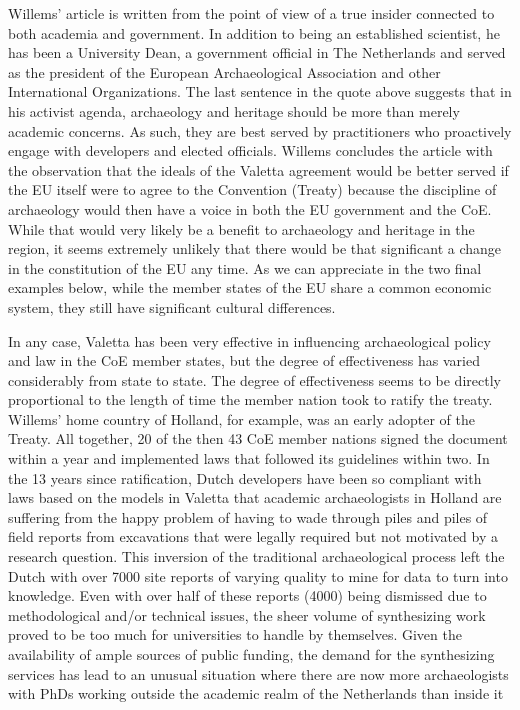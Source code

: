 Willems’ article is written from the point of view of a true insider connected to both academia and government. In addition to being an established scientist, he has been a University Dean, a government official in The Netherlands and served as the president of the European Archaeological Association and other International Organizations. The last sentence in the quote above suggests that in his activist agenda, archaeology and heritage should be more than merely academic concerns. As such, they are best served by practitioners who proactively engage with developers and elected officials. Willems concludes the article with the observation that the ideals of the Valetta agreement would be better served if the EU itself were to agree to the Convention (Treaty) because the discipline of archaeology would then have a voice in both the EU government and the CoE. While that would very likely be a benefit to archaeology and heritage in the region, it seems extremely unlikely that there would be that significant a change in the constitution of the EU any time. As we can appreciate in the two final examples below, while the member states of the EU share a common economic system, they still have significant cultural differences. 

In any case, Valetta has been very effective in influencing archaeological policy and law in the CoE member states, but the degree of effectiveness has varied considerably from state to state. The degree of effectiveness seems to be directly proportional to the length of time the member nation took to ratify the treaty. Willems’ home country of Holland, for example, was an early adopter of the Treaty. All together, \num{20} of the then \num{43} CoE member nations signed the document within a year and implemented laws that followed its guidelines within two. 
In the \num{13} years since ratification, Dutch developers have been so compliant with laws based on the models in Valetta that academic archaeologists in Holland are suffering from the happy problem of having to wade through piles and piles of field reports from excavations that were legally required but not motivated by a research question. This inversion of the traditional archaeological process left the Dutch with over \num{7000} site reports of varying quality to mine for data to turn into knowledge. 
Even with over half of these reports (\num{4000}) being dismissed due to methodological and/or technical issues, the sheer volume of synthesizing work proved to be too much for universities to handle by themselves. Given the availability of ample sources of public funding, the demand for the synthesizing services has lead to an unusual situation where there are now more archaeologists with PhDs working outside the academic realm of the Netherlands than inside it %

